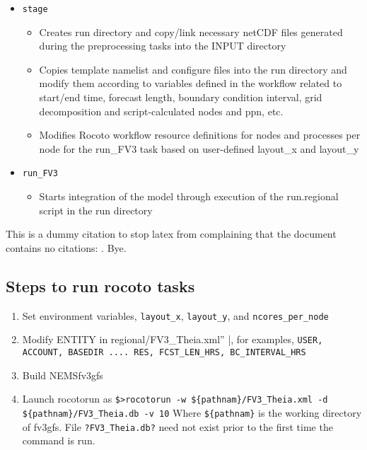 \begin{itemize}
\begin{itemize}
    \end{itemize}
\item \verb|stage|
    \begin{itemize}
    \item Creates run directory and copy/link necessary netCDF files generated during the preprocessing tasks into the INPUT directory
    \item Copies template namelist and configure files into the run directory and modify them according to variables defined in the workflow related to start/end time, forecast length, boundary condition interval, grid decomposition and script-calculated nodes and ppn, etc.
    \item Modifies Rocoto workflow resource definitions for nodes and processes per node for the run\_FV3 task based on user-defined layout\_x and layout\_y 
\end{itemize}
\item \verb|run_FV3|
    \begin{itemize}
    \item Starts integration of the model through execution of the run.regional script in the run directory
    \end{itemize}
\end{itemize}

This is a dummy citation to stop latex from complaining that the document contains no citations: \cite{Anderson2007}.  
Bye.


\subsection{Steps to run rocoto tasks}

\begin{enumerate}
\item Set environment variables, \verb|layout_x|, \verb|layout_y|, and \verb|ncores_per_node|
\item Modify ENTITY in \verb ''regional/FV3_Theia.xml'' |, for examples, 
\verb|USER, ACCOUNT, BASEDIR .... RES, FCST_LEN_HRS, BC_INTERVAL_HRS|
\item Build NEMSfv3gfs
\item Launch rocotorun as
\verb|$>rocotorun -w ${pathnam}/FV3_Theia.xml -d ${pathnam}/FV3_Theia.db -v 10|
Where \verb|${pathnam}| is the working directory of fv3gfs. File \verb|?FV3_Theia.db?| need not exist prior to the first time the command is run.
\end{enumerate}



